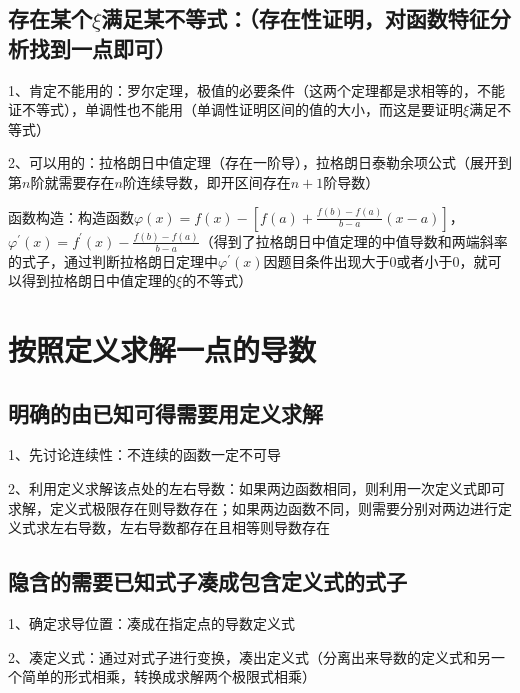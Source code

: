 \subsection{存在某个$\xi$满足某不等式：（存在性证明，对函数特征分析找到一点即可）}

1、肯定不能用的：罗尔定理，极值的必要条件（这两个定理都是求相等的，不能证不等式），单调性也不能用（单调性证明区间的值的大小，而这是要证明$\xi$满足不等式）

2、可以用的：拉格朗日中值定理（存在一阶导），拉格朗日泰勒余项公式（展开到第$n$阶就需要存在$n$阶连续导数，即开区间存在$n+1$阶导数）

函数构造：构造函数$\varphi(x)=f(x)-\left[f(a)+\frac{f(b)-f(a)}{b-a}(x-a)\right]$，$\varphi^{\prime}(x)=f^{\prime}(x)-\frac{f(b)-f(a)}{b-a}$（得到了拉格朗日中值定理的中值导数和两端斜率的式子，通过判断拉格朗日定理中$\varphi^{\prime}(x)$因题目条件出现大于0或者小于0，就可以得到拉格朗日中值定理的$\xi$的不等式）



\section{按照定义求解一点的导数}



\subsection{明确的由已知可得需要用定义求解}

1、先讨论连续性：不连续的函数一定不可导

2、利用定义求解该点处的左右导数：如果两边函数相同，则利用一次定义式即可求解，定义式极限存在则导数存在；如果两边函数不同，则需要分别对两边进行定义式求左右导数，左右导数都存在且相等则导数存在



\subsection{隐含的需要已知式子凑成包含定义式的式子}

1、确定求导位置：凑成在指定点的导数定义式

2、凑定义式：通过对式子进行变换，凑出定义式（分离出来导数的定义式和另一个简单的形式相乘，转换成求解两个极限式相乘）

